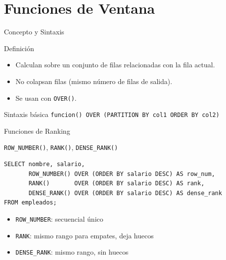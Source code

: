 \documentclass[aspectratio=169, 10pt, xcolor=table]{beamer}
\begin{document}
\section{Funciones de Ventana}

\begin{frame}{Concepto y Sintaxis}
    \begin{block}{Definición}
        \begin{itemize}
            \item Calculan sobre un conjunto de filas relacionadas con la fila actual.
            \item No colapsan filas (mismo número de filas de salida).
            \item Se usan con \texttt{OVER()}.
        \end{itemize}
    \end{block}
    \begin{exampleblock}{Sintaxis básica}
        \texttt{funcion() OVER (PARTITION BY col1 ORDER BY col2)}
    \end{exampleblock}
\end{frame}

\begin{frame}[fragile]{Funciones de Ranking}
    \begin{block}{\texttt{ROW\_NUMBER()}, \texttt{RANK()}, \texttt{DENSE\_RANK()}}
        \begin{lstlisting}
SELECT nombre, salario,
       ROW_NUMBER() OVER (ORDER BY salario DESC) AS row_num,
       RANK()       OVER (ORDER BY salario DESC) AS rank,
       DENSE_RANK() OVER (ORDER BY salario DESC) AS dense_rank
FROM empleados;
        \end{lstlisting}
    \end{block}
    \begin{itemize}
        \item \texttt{ROW\_NUMBER}: secuencial único
        \item \texttt{RANK}: mismo rango para empates, deja huecos
        \item \texttt{DENSE\_RANK}: mismo rango, sin huecos
    \end{itemize}
\end{frame}
\end{document}
